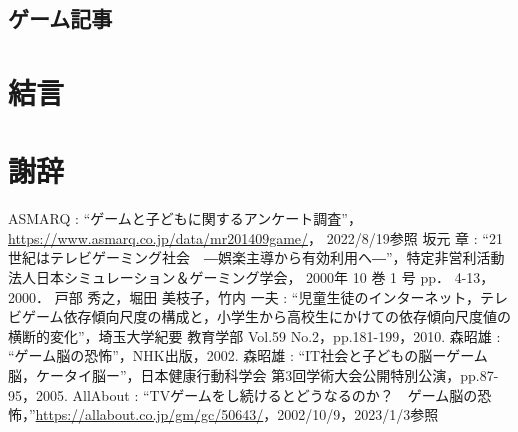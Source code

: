\documentclass[12pt,a4j,titlepage]{ltjsarticle}
\begin{document}
\subsection{ゲーム記事}




\section{結言}

\section{謝辞}

\begin{thebibliography}{99}
 ASMARQ : ``ゲームと子どもに関するアンケート調査''， \url{https://www.asmarq.co.jp/data/mr201409game/}， 2022/8/19参照
 坂元 章 : ``21世紀はテレビゲーミング社会　―娯楽主導から有効利用ヘ―''，特定非営利活動法人日本シミュレーション＆ゲーミング学会， 2000年 10 巻 1 号 pp． 4-13， 2000．
戸部 秀之，堀田 美枝子，竹内 一夫 : ``児童生徒のインターネット，テレビゲーム依存傾向尺度の構成と，小学生から高校生にかけての依存傾向尺度値の横断的変化''，埼玉大学紀要 教育学部 Vol.59 No.2，pp.181-199，2010.
森昭雄 : ``ゲーム脳の恐怖''，NHK出版，2002.
森昭雄 : ``IT社会と子どもの脳ーゲーム脳，ケータイ脳ー''，日本健康行動科学会 第3回学術大会公開特別公演，pp.87-95，2005.
AllAbout : ``TVゲームをし続けるとどうなるのか？　ゲーム脳の恐怖，''\url{https://allabout.co.jp/gm/gc/50643/}，2002/10/9，2023/1/3参照
\bibitem{}
\end{thebibliography}
\end{document}
